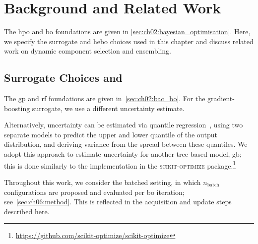 \section{Background and Related Work}
\label{sec:ch06:back-rw}

The \gls{hpo} and \gls{bo} foundations are given in \cref{sec:ch02:bayesian_optimisation}. Here, we specify the surrogate and \gls{hebo} choices used in this chapter and discuss related work on dynamic component selection and ensembling.

\subsection{Surrogate Choices and }
\label{sec:ch06:hebo}

The \gls{gp} and \gls{rf} foundations are given in~\cref{sec:ch02:bac_bo}. For the gradient-boosting surrogate, we use a different uncertainty estimate.

Alternatively, uncertainty can be estimated via quantile regression~\citep{KoeBas78}, using two separate models to predict the upper and lower quantile of the output distribution, and deriving variance from the spread between these quantiles.
We adopt this approach to estimate uncertainty for another tree-based model, \gls{gb}; this is done similarly to the implementation in the \textsc{scikit-optimize} package.\footnote{\url{https://github.com/scikit-optimize/scikit-optimize}}

Throughout this work, we consider the batched setting, in which $n_{\mathrm{batch}}$ configurations are proposed and evaluated per \gls{bo} iteration; see~\cref{sec:ch06:method}. This is reflected in the acquisition and update steps described here.

